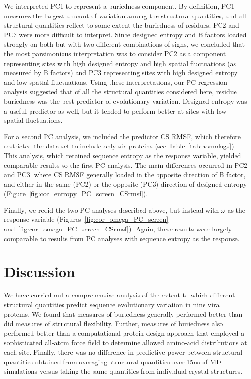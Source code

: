 \documentclass[smallextended]{svjour3}
\begin{document}
We interpreted PC1 to represent a buriedness component. By definition, PC1 measures the largest amount of variation among the structural quantities, and all structural quantities reflect to some extent the buriedness of residues. PC2 and PC3 were more difficult to interpret. Since designed entropy and B factors loaded strongly on both but with two different combinations of signs, we concluded that the most parsimonious interpretation was to consider PC2 as a component representing sites with high designed entropy and high spatial fluctuations (as measured by B factors) and PC3 representing sites with high designed entropy and low spatial fluctuations. Using these interpretations, our PC regression analysis suggested that of all the structural quantities considered here, residue buriedness was the best predictor of evolutionary variation. Designed entropy was a useful predictor as well, but it tended to perform better at sites with low spatial fluctuations.

For a second PC analysis, we included the predictor CS RMSF, which therefore restricted the data set to include only six proteins (see Table~\ref{tab:homologs}). This analysis, which retained sequence entropy as the response variable, yielded comparable results to the first PC analysis. The main differences occurred in PC2 and PC3, where CS RMSF generally loaded in the opposite direction of B factor, and either in the same (PC2) or the opposite (PC3) direction of designed entropy (Figure~\ref{fig:cor_entropy_PC_screen_CSrmsf}). 

Finally, we redid the two PC analyses described above, but instead with $\omega$ as the response variable (Figures~\ref{fig:cor_omega_PC_screen} and~\ref{fig:cor_omega_PC_screen_CSrmsf}). Again, these results were largely comparable to results from PC analyses with sequence entropy as the response.

\section*{Discussion}

We have carried out a comprehensive analysis of the extent to which different structural quantities predict sequence evolutionary variation in nine viral proteins. We  found that measures of buriedness generally performed better than did measures of structural flexibility. Further, measures of buriedness also performed better than a computational protein-design approach that employed a sophisticated all-atom force field to determine allowed amino-acid distributions at each site. Finally, there was no difference in predictive power between structural quantities obtained from averaging structural quantities over 15ns of MD simulations versus taking the same quantities from individual crystal structures. 
\end{document}
